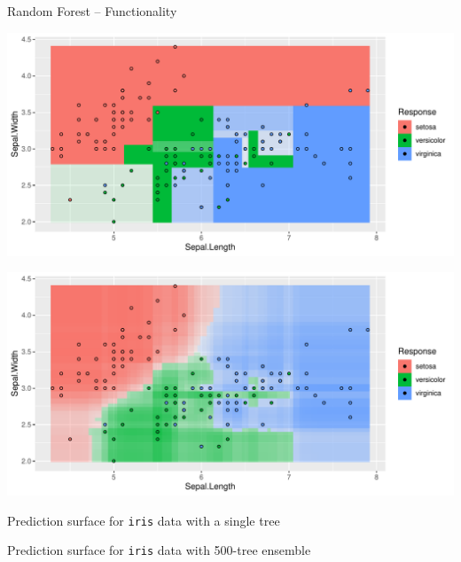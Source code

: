 \documentclass[11pt,compress,t,notes=noshow, xcolor=table]{beamer}
\let\code=\texttt
\begin{document}
\begin{frame}{Random Forest -- Functionality}
\begin{minipage}{0.5\textwidth}
  \includegraphics[width=\textwidth]{figure/rf-10}
\end{minipage}%
\begin{minipage}{0.5\textwidth}
  \includegraphics[width=\textwidth]{figure/rf-500}
\end{minipage}
\begin{minipage}{0.5\textwidth}
  \tiny Prediction surface for \code{iris} data with a single tree
\end{minipage}%
\begin{minipage}{0.5\textwidth}
  \tiny Prediction surface for \code{iris} data with 500-tree ensemble
\end{minipage}

\end{frame}

\end{document}
